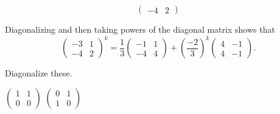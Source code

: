 \begin{exercises}
\begin{equation*}
\begin{pmatrix}
        -4  &2
      \end{pmatrix}
    \end{equation*}
    \begin{answer}
      Diagonalizing and then taking powers of the diagonal matrix shows that
      \begin{equation*}
        \begin{pmatrix}
          -3  &1  \\
          -4  &2
        \end{pmatrix}^k
        =
        \frac{1}{3}
        \begin{pmatrix}
          -1  &1  \\
          -4  &4
        \end{pmatrix}
        +(\frac{-2}{3})^k
        \begin{pmatrix}
           4  &-1 \\
           4  &-1
        \end{pmatrix}.
      \end{equation*}  
     \end{answer}
  \recommended \item \label{exer:DiagThese} 
    Diagonalize these.
    \begin{exparts*}
      \partsitem \( \begin{pmatrix}
                  1  &1  \\
                  0  &0
               \end{pmatrix} \)
      \partsitem \( \begin{pmatrix}
                  0  &1  \\
                  1  &0
               \end{pmatrix} \)
    \end{exparts*}
    \begin{answer}
\end{answer}
\end{exercises}
